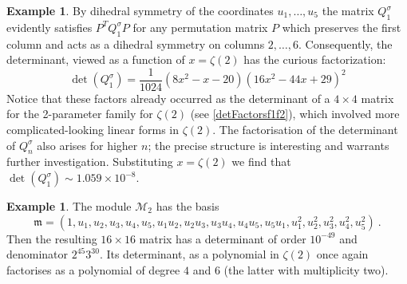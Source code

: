\documentclass[a4paper,10pt]{amsart}
\theoremstyle{definition}
\newtheorem{example}[thm]{Example}
\theoremstyle{remark}
\numberwithin{equation}{section}
\newcommand{\m}{\mathfrak{m}}
\newcommand{\0}{\color{blue}{\mathsf{0}}}
\begin{document}
\begin{example}
By dihedral symmetry of the coordinates $u_1,\ldots, u_5$ the matrix $Q^{\sigma}_{1}$ evidently satisfies $P^T Q^{\sigma}_{1} P$ for any permutation matrix $P$ which preserves the first column and acts as a dihedral symmetry on columns $2,\ldots, 6$.  Consequently, 
the determinant, viewed as  a function of $x= \zeta(2)$ has the curious factorization:
\[ \det( Q^{\sigma}_{1})  =\frac{1}{1024} (8x^2-x-20) (16 x^2 - 44x + 29)^2  \]
Notice that these factors already occurred as the determinant of a $4\times 4$ matrix  for the 2-parameter family for $\zeta(2)$ (see \eqref{detFactorsf1f2}), which involved  more complicated-looking linear forms in $\zeta(2)$. The factorisation of the determinant  of $Q^{\sigma}_n$ also arises for higher $n$; the precise structure is interesting and warrants further investigation. 
Substituting $x= \zeta(2)$ we find that 
$\det(Q^{\sigma}_{1}) \sim 1.059 \times 10^{-8}$.


\end{example} 

\begin{example}
The module $\mathcal{M}_2$ has the basis
\[ \m = (1,  u_1, u_2, u_3, u_4, u_5 ,u_1u_2,u_2u_3,u_3u_4,u_4u_5,u_5u_1,u_1^2,u_2^2,u_3^2,u_4^2,u_5^2 ) \ .\]
Then the resulting $16 \times 16$ matrix has a determinant of order $10^{-49}$ and denominator $2^{45} 3^{30}$.  Its determinant, as a polynomial in $\zeta(2)$ once again factorises as  a polynomial of degree $4$ and $6$ (the latter with multiplicity two).
\end{example}
\end{document}
